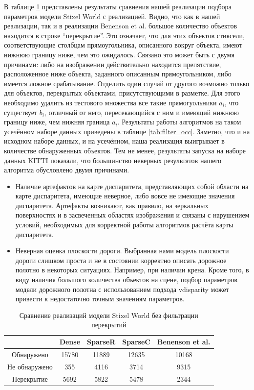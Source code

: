 \documentclass[aps,%
14pt,%
final,%
oneside,
onecolumn,%
musixtex, %
superscriptaddress,%
centertags]{extarticle} %
\begin{document}
В таблице \ref{tab:no_filter_occ} представлены результаты сравнения нашей реализации подбора параметров модели Stixel World с реализацией\cite{doppia_repo}. Видно, что как в нашей реализации, так и в реализации Benenson et al. большое количество объектов находится в строке ``перекрытие''. Это означает, что для этих объектов стиксели, соответствующие столбцам прямоугольника, описанного вокруг объекта, имеют нижнюю границу ниже, чем это ожидалось. Связано это может быть с двумя причинами: либо на изображении действительно находится препятствие, расположенное ниже объекта, заданного описанным прямоугольником, либо имеется ложное срабатывание. Отделить один случай от другого возможно только для объектов, перекрытых объектами, присутствующими в разметке. Для этого необходимо удалить из тестового множества все такие прямогуольники $a_i$, что существует $b_i$, отличный от него, пересекающийся с ним и имеющий нижнюю границу ниже, чем нижняя граница $a_i$. Результаты работы алгоритмов на таком усечённом наборе данных приведены в таблице \ref{tab:filter_occ}. Заметно, что и на исходном наборе данных, и на усечённом, наша реализация выигрывает в количестве обнаруженных объектов. Тем не менее, результаты запуска на наборе данных KITTI показали, что большинство неверных результатов нашего алгоритма обусловлено двумя причинами.
\begin{itemize}
\item Наличие артефактов на карте диспаритета, представляющих собой области на карте диспаритета, имеющие неверное, либо вовсе не имеющие значения диспаритета. Артефакты возникают, как правило, на зеркальных поверхностях и в засвеченных областях изображения и связаны с нарушением условий, необходимых для корректной работы алгоритмов расчёта карты диспаритета. 
\item Неверная оценка плоскости дороги. Выбранная нами модель плоскости дороги слишком проста и не в состоянии корректно описать дорожное полотно в некоторых ситуациях. Например, при наличии крена. Кроме того, в виду наличия большого количества объектов на сцене, подбор параметров модели дорожного полотна с использованием подхода vdisparity может привести к недостаточно точным значениям параметров.
\end{itemize}

\begin{table}
\center
\begin{tabular}{|c|c|c|c|c|}
\hline
	 & Dense & SparseR & SparseC & Benenson et al. \cite{doppia_repo} \\
\hline
	Обнаружено 			& 15780 & 11889 & 12635 & 10168\\
\hline
	Не обнаружено 		& 355   & 4116  & 3714 & 9315\\
\hline
	Перекрытие			& 5692  & 5822  & 5478 & 2344\\
\hline
\end{tabular}
\caption{Сравнение реализаций модели Stixel World без фильтрации перекрытий}
\label{tab:no_filter_occ}
\end{table}
\end{document}
